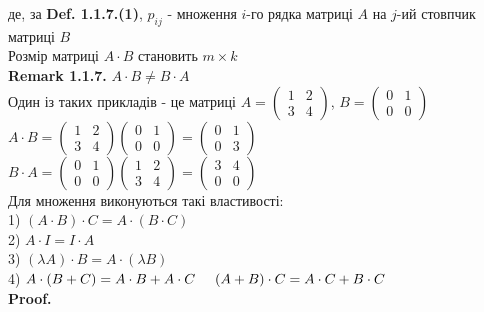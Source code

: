 \documentclass[a4paper, 10pt]{article}
\def\rm#1{\textbf{Remark {#1}}}
\def\proof{\textbf{Proof.}\\}
\theoremstyle{theoremdd}
\theoremstyle{theoremdd}
\theoremstyle{theoremdd}
\theoremstyle{theoremdd}
\theoremstyle{theoremdd}
\theoremstyle{theoremdd}
\theoremstyle{theoremdd}
\theoremstyle{theoremdd}
\begin{document}
	де, за \textbf{Def. 1.1.7.(1)}, $p_{ij}$ - множення $i$-го рядка матриці $A$ на $j$-ий стовпчик матриці $B$\\
	Розмір матриці $A \cdot B$ становить $m \times k$
	\bigskip \\
	\rm{1.1.7.} $A \cdot B \neq B \cdot A$\\
	Один із таких прикладів - це матриці $A = \begin{pmatrix}
	1 & 2 \\
	3 & 4
	\end{pmatrix}$, $B = \begin{pmatrix}
	0 & 1 \\
	0 & 0
\end{pmatrix}$\\
$A \cdot B = \begin{pmatrix} 1 & 2 \\ 3 & 4 \end{pmatrix} \begin{pmatrix} 0 & 1 \\ 0 & 0 \end{pmatrix} = \begin{pmatrix} 0 & 1 \\ 0 & 3 
\end{pmatrix}$\\
$B \cdot A = \begin{pmatrix} 0 & 1 \\ 0 & 0 \end{pmatrix} \begin{pmatrix} 1 & 2 \\ 3 & 4 \end{pmatrix} = \begin{pmatrix} 3 & 4 \\ 0 & 0 
\end{pmatrix}$
	\bigskip \\
	Для множення виконуються такі властивості:\\
	1) $(A \cdot B) \cdot C = A \cdot (B \cdot C)$\\
	2) $A \cdot I = I \cdot A$\\
	3) $(\lambda A) \cdot B = A \cdot (\lambda B)$\\
	4) $A \cdot (B+C) = A\cdot B + A\cdot C \hspace{0.5 cm} (A+B)\cdot C = A\cdot C + B \cdot C$\\
	\proof
\end{document}
